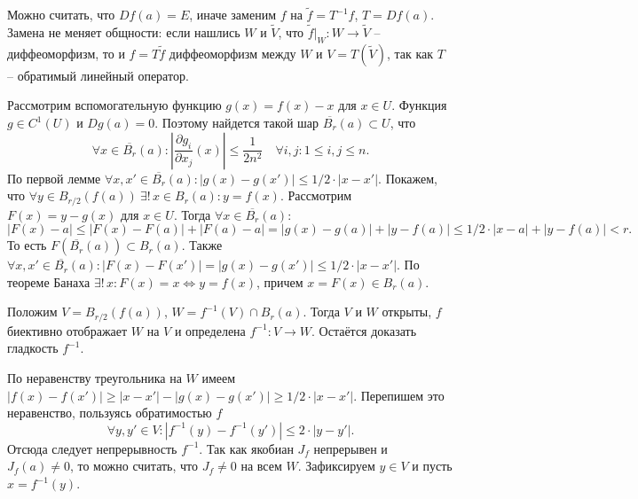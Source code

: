 \begin{myproof}
	Можно считать, что $Df(a) = E$, иначе заменим $f$ на $\widetilde{f} = T^{-1} f$, $T = Df(a)$. 
	Замена не меняет общности: если нашлись $W$ и $\widetilde{V}$, что $\widetilde{f}|_W : W \to \widetilde{V}$ -- диффеоморфизм, то и $f = T \widetilde{f}$ диффеоморфизм между $W$ и $V = T(\widetilde{V})$, так как $T$ -- обратимый линейный оператор.

	\vspace{5pt}
	Рассмотрим вспомогательную функцию $g(x) = f(x) - x$ для $x \in U$. 
	Функция $g \in C^1(U)$ и $Dg(a) = 0$. Поэтому найдется такой шар $\overline{B_r}(a) \subset U$, что 
	\[ \forall x \in \overline{B_r}(a) : \left|\frac{\partial g_i}{\partial x_j}(x)\right| \leq \frac{1}{2n^2} \quad \forall i, j : 1 \leq i, j \leq n. \] 
	По первой лемме $\forall x, x' \in \overline{B_r}(a) : |g(x) - g(x')| \leq 1/2 \cdot |x-x'|$.
	Покажем, что $\forall y \in B_{r/2} (f(a)) \ \exists! \, x \in B_r(a) : y = f(x)$.
	Рассмотрим $F(x) = y - g(x)$ для $x \in U$. 
	Тогда $\forall x \in \overline{B_r}(a)$:
	\[  |F(x) - a| \leq |F(x) - F(a)| + |F(a) - a| = |g(x) - g(a)| + |y - f(a)| \leq 1/2 \cdot |x - a| + |y - f(a)| < r. \]
	То есть $F(\overline{B_r}(a)) \subset B_r(a)$.
	Также $\forall x, x' \in \overline{B_r}(a) : |F(x) - F(x')| = |g(x) - g(x')| \leq 1/2 \cdot |x - x'|$.
	По теореме Банаха $\exists! \, x : F(x) = x \iff y = f(x)$, причем $x = F(x) \in B_r(a)$.

	\vspace{5pt}
	Положим $V = B_{r/2}(f(a))$, $W = f^{-1}(V) \cap B_r(a)$. 
	Тогда $V$ и $W$ открыты, $f$ биективно отображает $W$ на $V$ и определена $f^{-1} : V \to W$.
	Остаётся доказать гладкость $f^{-1}$.

	\vspace{5pt}
	По неравенству треугольника на $W$ имеем
	$ |f(x) - f(x')| \geq |x-x'| - |g(x) - g(x')| \geq 1/2 \cdot |x-x'|$.
	Перепишем это неравенство, пользуясь обратимостью $f$
	\[ \forall y, y' \in V : |f^{-1}(y) - f^{-1}(y')| \leq 2\cdot |y - y'|. \tag{$*$} \]
	Отсюда следует непрерывность $f^{-1}$.
	Так как якобиан $J_f$ непрерывен и $J_f(a) \neq 0$, то можно считать, что $J_f \neq 0$ на всем $W$.
	Зафиксируем $y \in V$ и пусть $x = f^{-1}(y)$. 
	

\end{myproof}
